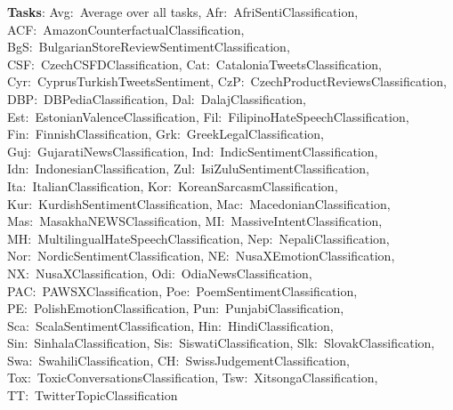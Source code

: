 \documentclass[11pt]{article}
\begin{document}
\begin{table}[H]
\vspace{2pt}
\begin{flushleft}
\footnotesize
\textbf{Tasks}:
Avg:~Average over all tasks,
Afr:~AfriSentiClassification,
ACF:~AmazonCounterfactualClassification,
BgS:~BulgarianStoreReviewSentimentClassification,
CSF:~CzechCSFDClassification,
Cat:~CataloniaTweetsClassification,
Cyr:~CyprusTurkishTweetsSentiment,
CzP:~CzechProductReviewsClassification,
DBP:~DBPediaClassification,
Dal:~DalajClassification,
Est:~EstonianValenceClassification,
Fil:~FilipinoHateSpeechClassification,
Fin:~FinnishClassification,
Grk:~GreekLegalClassification,
Guj:~GujaratiNewsClassification,
Ind:~IndicSentimentClassification,
Idn:~IndonesianClassification,
Zul:~IsiZuluSentimentClassification,
Ita:~ItalianClassification,
Kor:~KoreanSarcasmClassification,
Kur:~KurdishSentimentClassification,
Mac:~MacedonianClassification,
Mas:~MasakhaNEWSClassification,
MI:~MassiveIntentClassification,
MH:~MultilingualHateSpeechClassification,
Nep:~NepaliClassification,
Nor:~NordicSentimentClassification,
NE:~NusaXEmotionClassification,
NX:~NusaXClassification,
Odi:~OdiaNewsClassification,
PAC:~PAWSXClassification,
Poe:~PoemSentimentClassification,
PE:~PolishEmotionClassification,
Pun:~PunjabiClassification,
Sca:~ScalaSentimentClassification,
Hin:~HindiClassification,
Sin:~SinhalaClassification,
Sis:~SiswatiClassification,
Slk:~SlovakClassification,
Swa:~SwahiliClassification,
CH:~SwissJudgementClassification,
Tox:~ToxicConversationsClassification,
Tsw:~XitsongaClassification,
TT:~TwitterTopicClassification
\end{flushleft}
\end{table}
\end{document}
